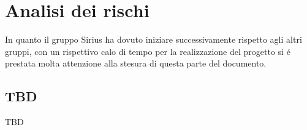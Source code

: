 
\section{Analisi dei rischi}
In quanto il gruppo Sirius ha dovuto iniziare successivamente rispetto agli altri gruppi, con un rispettivo calo di tempo per la realizzazione del progetto si \'e prestata molta attenzione alla stesura di questa parte del documento.\\
\subsection{TBD}
TBD\\